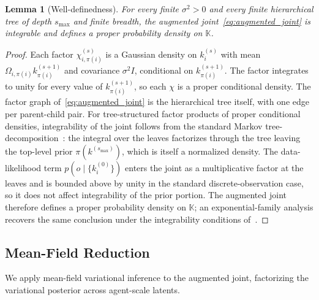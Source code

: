\documentclass[11pt]{article}
\newtheorem{lemma}{Lemma}
\begin{document}
\begin{lemma}[Well-definedness]
\label{lem:aug_joint_welldefined}
For every finite $\sigma^2 > 0$ and every finite hierarchical tree of depth $s_{\max}$ and finite breadth, the augmented joint~\eqref{eq:augmented_joint} is integrable and defines a proper probability density on $\mathbb{K}$.
\end{lemma}

\begin{proof}
Each factor $\chi_{i,\pi(i)}^{(s)}$ is a Gaussian density on $k_i^{(s)}$ with mean $\Omega_{i,\pi(i)} k_{\pi(i)}^{(s+1)}$ and covariance $\sigma^2 I$, conditional on $k_{\pi(i)}^{(s+1)}$. The factor integrates to unity for every value of $k_{\pi(i)}^{(s+1)}$, so each $\chi$ is a proper conditional density. The factor graph of~\eqref{eq:augmented_joint} is the hierarchical tree itself, with one edge per parent-child pair. For tree-structured factor products of proper conditional densities, integrability of the joint follows from the standard Markov tree-decomposition~\cite[\S3.2]{Lauritzen1996}: the integral over the leaves factorizes through the tree leaving the top-level prior $\pi(k^{(s_{\max})})$, which is itself a normalized density. The data-likelihood term $p(o \mid \{k_i^{(0)}\})$ enters the joint as a multiplicative factor at the leaves and is bounded above by unity in the standard discrete-observation case, so it does not affect integrability of the prior portion. The augmented joint therefore defines a proper probability density on $\mathbb{K}$; an exponential-family analysis recovers the same conclusion under the integrability conditions of~\cite[\S1.5]{Brown1986}.
\end{proof}

\subsection{Mean-Field Reduction}

We apply mean-field variational inference to the augmented joint, factorizing the variational posterior across agent-scale latents.
\end{document}
